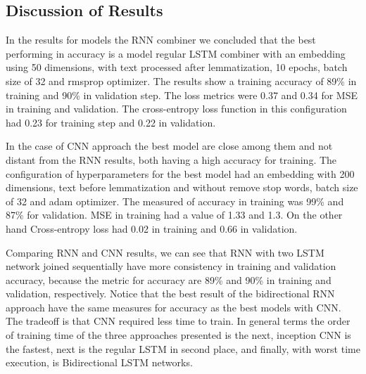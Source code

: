 \documentclass[12pt]{report}
\begin{document}
\subsection{Discussion of Results}

In the results for models  the \ac{RNN} combiner we concluded that the best performing in accuracy  is a model regular LSTM combiner with an embedding using 50 dimensions, with text processed after lemmatization, 10 epochs, batch size of 32 and rmsprop optimizer. The results show a training accuracy of 89\% in training and 90\% in validation step. The loss metrics were 0.37 and 0.34 for {MSE} in training and validation. The cross-entropy loss function in this configuration had 0.23 for training step and 0.22 in validation.

In the case of {CNN} approach the best model are close among them and not distant from the \ac{RNN} results, both having a high accuracy for training. The configuration of hyperparameters for the best model had an embedding with  200 dimensions, text before lemmatization and without remove stop words, batch size of 32 and adam optimizer. The measured of accuracy in training was 99\% and 87\% for validation. {MSE} in training had a value of 1.33 and 1.3. On the other hand Cross-entropy loss had 0.02 in training and 0.66 in validation. 



Comparing \ac{RNN} and \ac{CNN} results, we can see that {RNN} with two {LSTM} network joined sequentially have more consistency in training and validation accuracy, because the metric for accuracy are 89\% and 90\% in training and validation, respectively. 
Notice that the best result of the bidirectional \ac{RNN} approach have the same measures for accuracy as the best models with \ac{CNN}.  The tradeoff is 
that \ac{CNN} required less time to train. In general terms the order of training time of the three approaches presented is the next, inception {CNN} is the fastest, next is the regular \ac{LSTM} in second place, and finally, with worst time execution, is Bidirectional {LSTM} networks.
\end{document}
